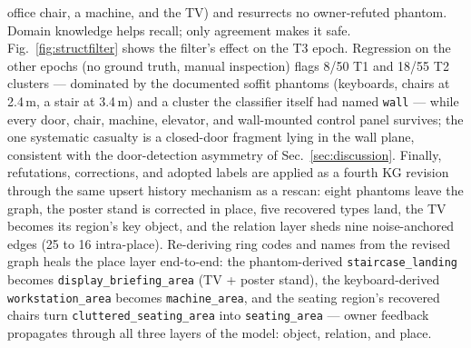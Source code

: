 office chair, a machine, and the TV) and resurrects no owner-refuted
phantom. Domain knowledge helps recall; only agreement makes it safe.
Fig.~\ref{fig:structfilter} shows the filter's effect on the T3 epoch.
Regression on the other epochs (no ground truth, manual inspection)
flags 8/50 T1 and 18/55 T2 clusters --- dominated by the documented
soffit phantoms (keyboards, chairs at 2.4\,m, a stair at 3.4\,m) and a
cluster the classifier itself had named \texttt{wall} --- while every
door, chair, machine, elevator, and wall-mounted control panel survives;
the one systematic casualty is a closed-door fragment lying in the wall
plane, consistent with the door-detection asymmetry of
Sec.~\ref{sec:discussion}. Finally, refutations, corrections, and
adopted labels are applied as a fourth KG revision through the same
upsert history mechanism as a rescan: eight phantoms leave the graph,
the poster stand is corrected in place, five recovered types land, the
TV becomes its region's key object, and the relation layer sheds nine
noise-anchored edges (25 to 16 intra-place). Re-deriving ring codes and
names from the revised graph heals the place layer end-to-end: the
phantom-derived \texttt{staircase\_landing} becomes
\texttt{display\_briefing\_area} (TV + poster stand), the
keyboard-derived \texttt{workstation\_area} becomes
\texttt{machine\_area}, and the seating region's recovered chairs turn
\texttt{cluttered\_seating\_area} into \texttt{seating\_area} ---
owner feedback propagates through all three layers of the model: object,
relation, and place.

